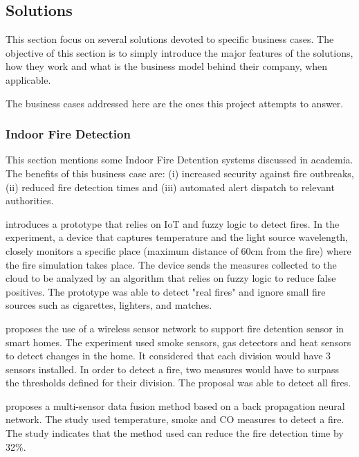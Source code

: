 \subsection{Solutions}
\label{subsec:stateofart:arch:solutions}

This section focus on several solutions devoted to specific business cases.
The objective of this section is to simply introduce the major features of the solutions, how they work and what is the business model behind their company, when applicable.

The business cases addressed here are the ones this project attempts to answer.

\subsubsection{Indoor Fire Detection}
\label{subsubsec:stateofart:arch:solutions:fire}

This section mentions some Indoor Fire Detention systems discussed in academia. The benefits of this business case are: (i) increased security against fire outbreaks, (ii) reduced fire detection times and (iii) automated alert dispatch to relevant authorities.  

\cite{listyorini2018prototype} introduces a prototype that relies on \gls{IoT} and fuzzy logic to detect fires. In the experiment, a device that captures temperature and the light source wavelength, closely monitors a specific place (maximum distance of 60cm from the fire) where the fire simulation takes place. The device sends the measures collected to the cloud to be analyzed by an algorithm that relies on fuzzy logic to reduce false positives. The prototype was able to detect "real fires" and ignore small fire sources such as cigarettes, lighters, and matches. 

\cite{saeed2018iot} proposes the use of a wireless sensor network to support fire detention sensor in smart homes. The experiment used smoke sensors, gas detectors and heat sensors to detect changes in the home. It considered that each division would have 3 sensors installed. In order to detect a fire, two measures would have to surpass the thresholds defined for their division. The proposal was able to detect all fires.

\cite{wu2021multi} proposes a multi-sensor data fusion method based on a back propagation neural network. The study used temperature, smoke and CO measures to detect a fire. The study indicates that the method used can reduce the fire detection time by 32\%.

